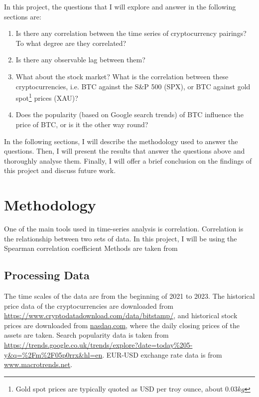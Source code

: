 \documentclass[a4paper, 10pt, conference]{ieeeconf}      %
\begin{document}
In this project, the questions that I will explore and answer in the following sections are:
\begin{enumerate}
    \item Is there any correlation between the time series of cryptocurrency pairings? To what degree are they correlated? %
    \item Is there any observable lag between them? %
    \item What about the stock market? What is the correlation between these cryptocurrencies, i.e. BTC against the S\&P 500 (SPX), or BTC against gold spot\footnote{Gold spot prices are typically quoted as USD per troy ounce, about $0.03kg$} prices (XAU)?
    \item Does the popularity (based on Google search trends) of BTC influence the price of BTC, or is it the other way round?
\end{enumerate}

In the following sections, I will describe the methodology used to answer the questions. Then, I will present the results that answer the questions above and thoroughly analyse them. Finally, I will offer a brief conclusion on the findings of this project and discuss future work.

\section{Methodology}
One of the main tools used in time-series analysis is correlation. Correlation is the relationship between two sets of data. In this project, I will be using the Spearman correlation coefficient  Methods are taken from \cite{Pal2017}
\subsection{Processing Data}
The time scales of the data are from the beginning of 2021 to 2023. The historical price data of the cryptocurrencies are downloaded from \url{https://www.cryptodatadownload.com/data/bitstamp/}, and historical stock prices are downloaded from \url{nasdaq.com}, where the daily closing prices of the assets are taken. Search popularity data is taken from \url{https://trends.google.co.uk/trends/explore?date=today\%205-y&q=\%2Fm\%2F05p0rrx&hl=en}. EUR-USD exchange rate data is from \url{www.macrotrends.net}.
\end{document}
